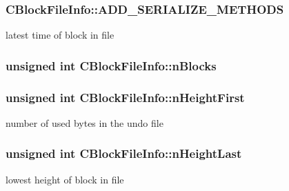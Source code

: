 \subsubsection[{A\+D\+D\+\_\+\+S\+E\+R\+I\+A\+L\+I\+Z\+E\+\_\+\+M\+E\+T\+H\+O\+D\+S}]{\setlength{\rightskip}{0pt plus 5cm}C\+Block\+File\+Info\+::\+A\+D\+D\+\_\+\+S\+E\+R\+I\+A\+L\+I\+Z\+E\+\_\+\+M\+E\+T\+H\+O\+D\+S}\label{class_c_block_file_info_ab4daf4df00f90dee15e3a7d2cdb7a273}


latest time of block in file 

\hypertarget{class_c_block_file_info_adf2de4bb4d8a0a8f2116ed90f0770d03}{}
\subsubsection[{n\+Blocks}]{\setlength{\rightskip}{0pt plus 5cm}unsigned int C\+Block\+File\+Info\+::n\+Blocks}\label{class_c_block_file_info_adf2de4bb4d8a0a8f2116ed90f0770d03}
\hypertarget{class_c_block_file_info_a66d258b11b1aec30cbacdc6130c271a8}{}
\subsubsection[{n\+Height\+First}]{\setlength{\rightskip}{0pt plus 5cm}unsigned int C\+Block\+File\+Info\+::n\+Height\+First}\label{class_c_block_file_info_a66d258b11b1aec30cbacdc6130c271a8}


number of used bytes in the undo file 

\hypertarget{class_c_block_file_info_aabbcf808931e7eaf2278b3d7172fad3a}{}
\subsubsection[{n\+Height\+Last}]{\setlength{\rightskip}{0pt plus 5cm}unsigned int C\+Block\+File\+Info\+::n\+Height\+Last}\label{class_c_block_file_info_aabbcf808931e7eaf2278b3d7172fad3a}


lowest height of block in file 

\hypertarget{class_c_block_file_info_afb13102ba49548c24812a4236851c3a9}{}
